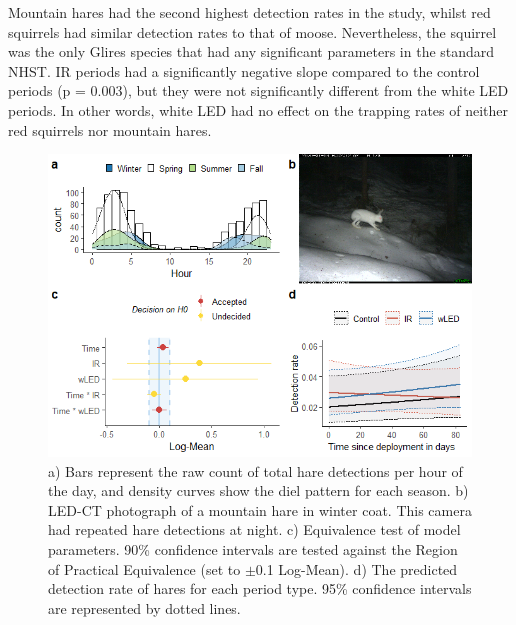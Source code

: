 Mountain hares had the second highest detection rates in the study, whilst red squirrels had similar detection rates to that of moose.
Nevertheless, the squirrel was the only Glires species that had any significant parameters in the standard NHST. IR periods had a significantly negative slope compared to the control periods (p = 0.003), but they were not significantly different from the white LED periods.
In other words, white LED had no effect on the trapping rates of neither red squirrels nor mountain hares.




\begin{figure}[b]
	\centering
	\includegraphics[width=12cm]{../R/glmm_sp_files/figure-html/hare2-1.png}
	\caption[Mountain hare]
	{\scriptsize
		a) Bars represent the raw count of total hare detections per hour of the day, and density curves show the diel pattern for each season.
		b) LED-CT photograph of a mountain hare in winter coat. This camera had repeated hare detections at night.
		c) Equivalence test of model parameters. 90\% confidence intervals are tested against the Region of Practical Equivalence (set to $\pm$0.1 Log-Mean). 
		d) The predicted detection rate of hares for each period type. 95\% confidence intervals are represented by dotted lines.}
	\label{hare}
\end{figure}


